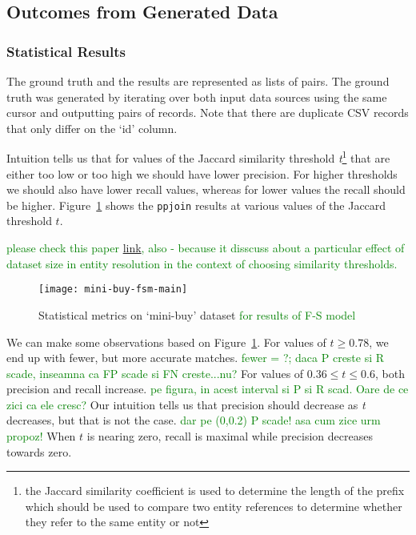 \subsection{Outcomes from Generated Data}\label{subsec:experiment-mini-buy}

\subsubsection{Statistical Results}

The ground truth and the results are represented as lists of pairs.
The ground truth was generated by iterating over both input data sources using
the same cursor and outputting pairs of records.
Note that there are duplicate CSV records that only differ on the `id' column.

Intuition tells us that for values of the Jaccard similarity threshold
\textit{t}\footnote[1]{the Jaccard similarity coefficient is used to determine
the length of the prefix which should be used to compare two entity references
to determine whether they refer to the same entity or not} that are either too
low or too high we should have lower precision.
For higher thresholds we should also have lower recall values, whereas for
lower values the recall should be higher.
Figure~\ref{fig:mini-buy-fs} shows the \texttt{ppjoin} results at various
values of the Jaccard threshold $t$.


\textcolor{green}{please check this paper \href{https://hpi.de/fileadmin/user_upload/fachgebiete/naumann/publications/2013/On_Choosing_Thresholds_for_Duplicate_Detection.pdf}{link}, also - because it disscuss about a particular effect of dataset size in entity resolution in the context of choosing similarity thresholds. }
\begin{figure}[!hp]
    \centering
    \captionsetup{justification=centering}
    \texttt{[image: mini-buy-fsm-main]}
    \caption{Statistical metrics on `mini-buy' dataset
    \textcolor{green}{for results of F-S model}
    }
    \label{fig:mini-buy-fs}
\end{figure}

We can make some observations based on Figure~\ref{fig:mini-buy-fs}.
For values of $t \geq 0.78$, we end up with fewer, but more accurate matches.
\textcolor{green}{fewer = ?; daca P creste si R scade, inseamna ca FP scade si FN creste...nu?} 
For values of $0.36 \leq t \leq 0.6$, both precision and recall increase. 
\textcolor{green}{pe figura, in acest interval si P  si R scad. Oare de ce zici ca ele cresc?} 
Our intuition tells us that precision should decrease as \textit{t} decreases,
but that is not the case.
\textcolor{green}{dar pe (0,0.2) P scade! asa cum zice urm propoz!} 
When $t$ is nearing zero, recall is maximal while precision decreases towards
zero.

